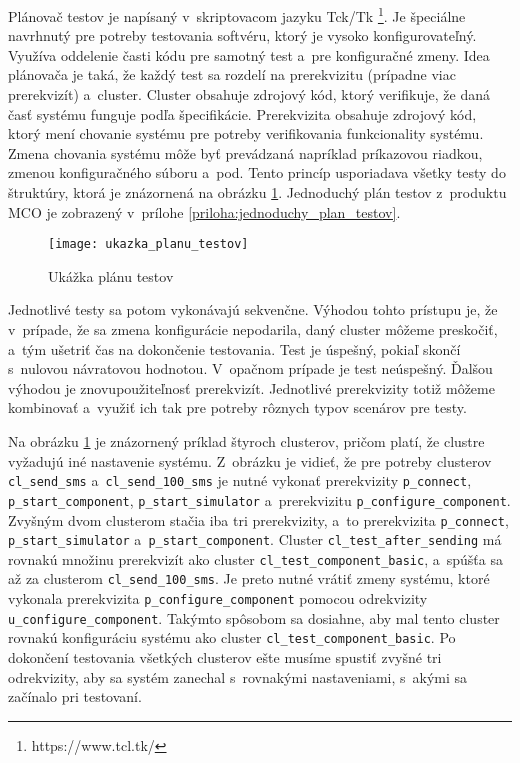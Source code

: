 Plánovač testov je napísaný v~skriptovacom jazyku Tck/Tk
\footnote{https://www.tcl.tk/}. 
Je špeciálne navrhnutý pre potreby testovania softvéru, ktorý je vysoko 
konfigurovateľný. Využíva oddelenie časti kódu pre samotný test
a~pre konfiguračné zmeny. Idea plánovača je taká, že každý test sa 
rozdelí na prerekvizitu (prípadne viac prerekvizít) a~cluster. Cluster 
obsahuje zdrojový kód, ktorý verifikuje, že daná časť systému funguje 
podľa špecifikácie. Prerekvizita obsahuje zdrojový kód, ktorý mení 
chovanie systému pre potreby verifikovania funkcionality systému.
Zmena chovania systému môže byť prevádzaná napríklad príkazovou riadkou, 
zmenou konfiguračného súboru a~pod.
Tento princíp usporiadava všetky testy do štruktúry, ktorá je znázornená 
na obrázku \ref{obrazok:ukazka_planu_testov}. Jednoduchý plán testov
z~produktu MCO je zobrazený v~prílohe \ref{priloha:jednoduchy_plan_testov}.

\begin{figure}[h]
  \begin{center}
    \texttt{[image: ukazka\_planu\_testov]}
    \caption{Ukážka plánu testov}
    \label{obrazok:ukazka_planu_testov}
  \end{center}
\end{figure}

Jednotlivé testy sa potom vykonávajú sekvenčne. Výhodou tohto prístupu 
je, že v~prípade, že sa zmena konfigurácie nepodarila, daný cluster 
môžeme preskočiť, a~tým ušetriť čas na dokončenie testovania. 
Test je úspešný, pokiaľ skončí s~nulovou návratovou hodnotou. 
V~opačnom prípade je test neúspešný.  
Ďalšou výhodou je znovupoužiteľnosť prerekvizít. 
Jednotlivé prerekvizity totiž môžeme kombinovať a~využiť ich tak pre 
potreby rôznych typov scenárov pre testy. 

Na obrázku \ref{obrazok:ukazka_planu_testov} je znázornený príklad štyroch 
clusterov, pričom platí, že clustre vyžadujú iné nastavenie systému. 
Z~obrázku je vidieť, že pre potreby clusterov \texttt{cl\_send\_sms}
a~\texttt{cl\_send\_100\_sms} je nutné vykonať prerekvizity \texttt{p\_connect}, 
\texttt{p\_start\_component}, \texttt{p\_start\_simulator} a~prerekvizitu 
\texttt{p\_configure\_component}. 
Zvyšným dvom clusterom stačia iba tri prerekvizity, a~to prerekvizita 
\texttt{p\_connect}, \texttt{p\_start\_simulator}
a~\texttt{p\_start\_component}. Cluster \texttt{cl\_test\_after\_sending} 
má rovnakú množinu prerekvizít ako cluster \texttt{cl\_test\_component\_basic}, 
a~spúšťa sa až za clusterom \texttt{cl\_send\_100\_sms}. 
Je preto nutné vrátiť zmeny systému, ktoré vykonala prerekvizita 
\texttt{p\_configure\_component} pomocou odrekvizity
\texttt{u\_configure\_component}. 
Takýmto spôsobom sa dosiahne, aby mal tento cluster rovnakú konfiguráciu 
systému ako cluster \texttt{cl\_test\_component\_basic}.
Po dokončení testovania všetkých clusterov ešte musíme spustiť zvyšné tri
odrekvizity, aby sa systém zanechal s~rovnakými nastaveniami, s~akými 
sa začínalo pri testovaní.

